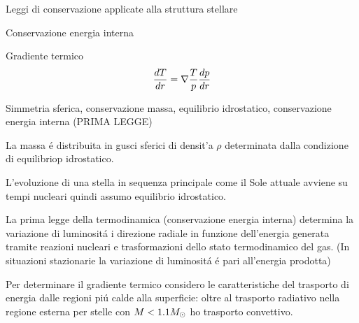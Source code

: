 \documentclass[10pt,xcolor={usenames},fleqn,mathserif,serif]{beamer}
\begin{document}
\begin{frame}{Leggi di conservazione applicate alla struttura stellare}
\begin{block}{Conservazione energia interna}
\end{block}

\begin{block}{Gradiente termico}
\begin{equation*}
\TDy{r}{T}=\nabla\frac{T}{p}\TDy{r}{p}
\end{equation*}
\end{block}

\end{frame}

\begin{wordonframe}{Simmetria sferica, conservazione massa, equilibrio idrostatico, conservazione energia interna (PRIMA LEGGE)}

La massa \'e distribuita in gusci sferici di densit'a $\rho$ determinata dalla condizione di equilibriop idrostatico.

{\small L'evoluzione di una stella in sequenza principale come il Sole attuale avviene su tempi nucleari quindi assumo equilibrio idrostatico.}



La prima legge della termodinamica (conservazione energia interna) determina la variazione di luminosit\'a i direzione radiale in funzione dell'energia generata tramite reazioni nucleari e trasformazioni dello stato termodinamico del gas. (In situazioni stazionarie la variazione di luminosit\'a \'e pari all'energia prodotta)

Per determinare il gradiente termico considero le caratteristiche del trasporto di energia dalle regioni pi\'u calde alla superficie: oltre al trasporto radiativo nella regione esterna per stelle con $M<1.1\msun{}$ ho trasporto convettivo.

\end{wordonframe}
\end{document}
